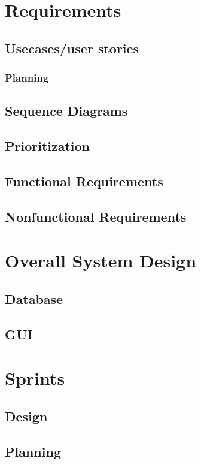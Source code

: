 \documentclass[10pt,a4paper,oneside]{report}
\begin{document}

\clearpage


\chapter{Requirements}
\section{Usecases/user stories}
\subsection{Planning}
\section{Sequence Diagrams}
\section{Prioritization}
\section{Functional Requirements}
\section{Nonfunctional Requirements}



\chapter{Overall System Design}
\section{Database}
\section{GUI}

\chapter{Sprints}
\section{Design}
\section{Planning}
\end{document}
